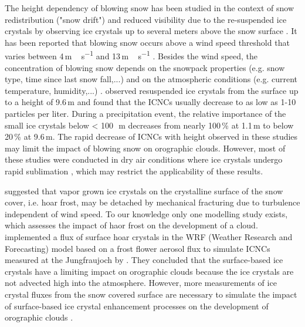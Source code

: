 \documentclass[draft,linenumbers]{agujournal}
\begin{document}
The height dependency of blowing snow has been studied in the context of snow redistribution ("snow drift") and reduced visibility due to the re-suspended ice crystals by observing ice crystals up to several meters above the snow surface \citep{Sch82, Nis05}. It has been reported that blowing snow occurs above a wind speed threshold that varies between 4\,\si{m\,s^{-1}} and 13\,\si{m\,s^{-1}} \citep{Bro88, Li97, Mah03, Der99}. Besides the wind speed, the concentration of blowing snow depends on the snowpack properties (e.g. snow type, time since last snow fall,...) and on the atmospheric conditions (e.g. current temperature, humidity,...) \citep{Vio13}. \citet{Nis05} observed resuspended ice crystals from the surface up to a height of 9.6\,\si{m} and found that the ICNCs usually decrease to as low as 1-10 particles per liter. During a precipitation event, the relative importance of the small ice crystals below < 100\,\si{\mu m} decreases from nearly 100\,\si{\%} at 1.1\,\si{m} to below 20\,\si{\%} at 9.6\,\si{m}. The rapid decrease of ICNCs with height observed in these studies may limit the impact of blowing snow on orographic clouds. However, most of these studies were conducted in dry air conditions where ice crystals undergo rapid sublimation \citep{Yan08}, which may restrict the applicability of these results.

\citet{Loy15} suggested that vapor grown ice crystals on the crystalline surface of the snow cover, i.e. hoar frost, may be detached by mechanical fracturing due to turbulence independent of wind speed. To our knowledge only one modelling study exists, which assesses the impact of haor frost on the development of a cloud. \citet{Far15} implemented a flux of surface hoar crystals in the WRF (Weather Research and Forecasting) model based on a frost flower aerosol flux to simulate ICNCs measured at the Jungfraujoch by \citet{Loy15}. They concluded that the surface-based ice crystals have a limiting impact on orographic clouds because the ice crystals are not advected high into the atmosphere. However, more measurements of ice crystal fluxes from the snow covered surface are necessary to simulate the impact of surface-based ice crystal enhancement processes on the development of orographic clouds \citep{Far15}.
\end{document}
